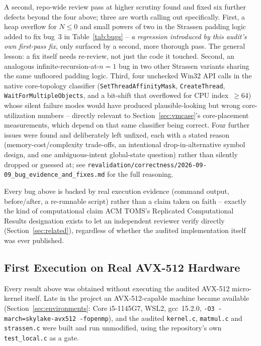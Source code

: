 \documentclass[acmsmall]{acmart}
\begin{document}
A second, repo-wide review pass at higher scrutiny found and fixed six
further defects beyond the four above; three are worth calling out
specifically. First, a heap overflow for $N \le 0$ and small powers of
two in the Strassen padding logic added to fix bug~3 in
Table~\ref{tab:bugs} -- \emph{a regression introduced by this audit's
own first-pass fix}, only surfaced by a second, more thorough pass. The
general lesson: a fix itself needs re-review, not just the code it
touched. Second, an analogous infinite-recursion-at-$n{=}1$ bug in two
other Strassen variants sharing the same unfloored padding logic. Third,
four unchecked Win32 API calls in the native core-topology classifier
(\texttt{SetThreadAffinityMask}, \texttt{CreateThread},
\texttt{WaitForMultipleObjects}, and a bit-shift that overflowed for
CPU index~$\ge$64) whose silent failure modes would have produced
plausible-looking but wrong core-utilization numbers -- directly
relevant to Section~\ref{sec:vmcase}'s core-placement measurements,
which depend on that same classifier being correct. Four further issues
were found and deliberately left unfixed, each with a stated reason
(memory-cost/complexity trade-offs, an intentional drop-in-alternative
symbol design, and one ambiguous-intent global-state question) rather
than silently dropped or guessed at; see
\texttt{revalidation/correctness/2026-09-09\_bug\_evidence\_and\_fixes.md}
for the full reasoning.

Every bug above is backed by real execution evidence (command output,
before/after, a re-runnable script) rather than a claim taken on faith
-- exactly the kind of computational claim ACM TOMS's Replicated
Computational Results designation exists to let an independent
reviewer verify directly (Section~\ref{sec:related}), regardless of
whether the audited implementation itself was ever published.

\subsection{First Execution on Real AVX-512 Hardware}
\label{sec:avx512}

Every result above was obtained without executing the audited AVX-512
micro-kernel itself. Late in the project an AVX-512-capable machine
became available (Section~\ref{sec:environments}: Core i5-1145G7, WSL2,
gcc~15.2.0, \texttt{-O3 -march=skylake-avx512 -fopenmp}), and the
audited \texttt{kernel.c}, \texttt{matmul.c} and \texttt{strassen.c}
were built and run unmodified, using the repository's own
\texttt{test\_local.c} as a gate.
\end{document}
